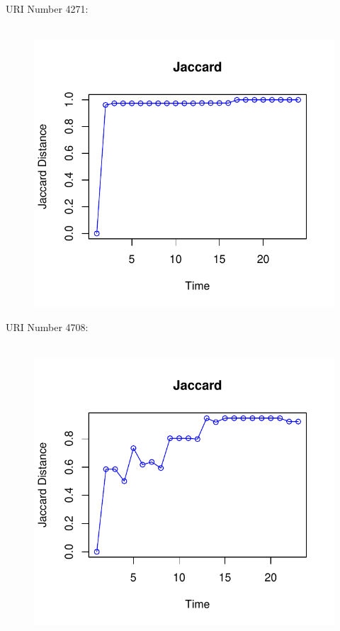 \documentclass[12pt]{article}
\begin{document}
URI Number 4271:\\
\begin{figure}[H]
    \centering
    \includegraphics[scale=0.7]{4271.pdf}
\end{figure}

URI Number 4708:\\
\begin{figure}[H]
    \centering
    \includegraphics[scale=0.7]{4708.pdf}
\end{figure}
\end{document}
